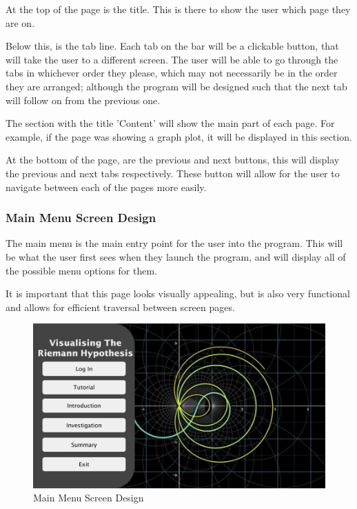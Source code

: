 \documentclass{article}
\begin{document}
At the top of the page is the title. This is there to show the user which page they are on.

Below this, is the tab line. Each tab on the bar  will be a clickable button, that will take the user to a different screen. The user will be able to go through the tabs in whichever order they please, which may not necessarily be in the order they are arranged; although the program will be designed such that the next tab will follow on from the previous one.

The section with the title 'Content' will show the main part of each page. For example, if the page was showing a graph plot, it will be displayed in this section.

At the bottom of the page, are the previous and next buttons, this will display the previous and next tabs respectively. These button will allow for the user to navigate between each of the pages more easily.

\clearpage
\subsubsection{Main Menu Screen Design}

The main menu is the main entry point for the user into the program. This will be what the user first sees when they launch the program, and will display all of the possible menu options for them.

It is important that this page looks visually appealing, but is also very functional and allows for efficient traversal between screen pages.

\begin{figure}[ht]
    \centering
    \includegraphics[scale=0.2]{main-menu-screen-design}
    \caption{Main Menu Screen Design}
\end{figure}
\end{document}
